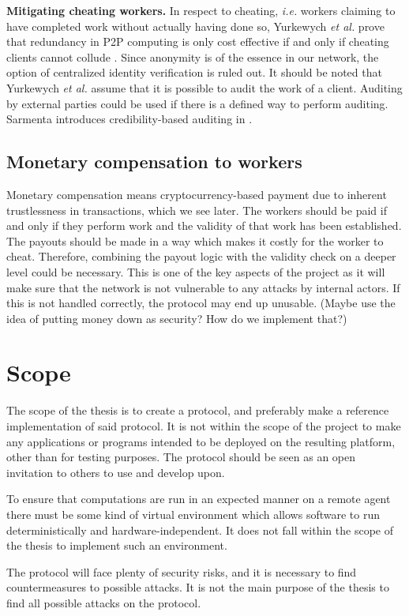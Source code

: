 \textbf{Mitigating cheating workers.}
In respect to cheating, \textit{i.e.} workers claiming to have completed work without actually having done so, Yurkewych \textit{et al.} prove that redundancy in P2P computing is only cost effective if and only if cheating clients cannot collude \cite{yurkewych:2005}. Since anonymity is of the essence in our network, the option of centralized identity verification is ruled out. It should be noted that Yurkewych \textit{et al.} assume that it is possible to audit the work of a client. Auditing by external parties could be used if there is a defined way to perform auditing. Sarmenta introduces credibility-based auditing in \cite{sarmenta:2002}.

\subsection{Monetary compensation to workers}
Monetary compensation means cryptocurrency-based payment due to inherent trustlessness in transactions, which we see later. The workers should be paid if and only if they perform work and the validity of that work has been established. The payouts should be made in a way which makes it costly for the worker to cheat. Therefore, combining the payout logic with the validity check on a deeper level could be necessary. This is one of the key aspects of the project as it will make sure that the network is not vulnerable to any attacks by internal actors. If this is not handled correctly, the protocol may end up unusable. (Maybe use the idea of putting money down as security? How do we implement that?) 

\section{Scope}
The scope of the thesis is to create a protocol, and preferably make a reference implementation of said protocol. It is not within the scope of the project to make any applications or programs intended to be deployed on the resulting platform, other than for testing purposes. The protocol should be seen as an open invitation to others to use and develop upon.

To ensure that computations are run in an expected manner on a remote agent there must be some kind of virtual environment which allows software to run deterministically and hardware-independent. It does not fall within the scope of the thesis to implement such an environment.

The protocol will face plenty of security risks, and it is necessary to find countermeasures to possible attacks. It is not the main purpose of the thesis to find all possible attacks on the protocol.